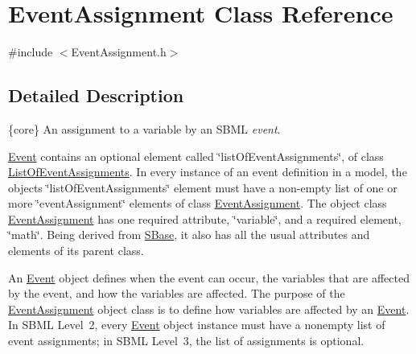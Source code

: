 \hypertarget{class_event_assignment}{}\section{Event\+Assignment Class Reference}
\label{class_event_assignment}


{\ttfamily \#include $<$Event\+Assignment.\+h$>$}



\subsection{Detailed Description}
\{core\} An assignment to a variable by an S\+B\+ML {\itshape event}.

\hyperlink{class_event}{Event} contains an optional element called \char`\"{}list\+Of\+Event\+Assignments\char`\"{}, of class \hyperlink{class_list_of_event_assignments}{List\+Of\+Event\+Assignments}. In every instance of an event definition in a model, the object\textquotesingle{}s \char`\"{}list\+Of\+Event\+Assignments\char`\"{} element must have a non-\/empty list of one or more \char`\"{}event\+Assignment\char`\"{} elements of class \hyperlink{class_event_assignment}{Event\+Assignment}. The object class \hyperlink{class_event_assignment}{Event\+Assignment} has one required attribute, \char`\"{}variable\char`\"{}, and a required element, \char`\"{}math\char`\"{}. Being derived from \hyperlink{class_s_base}{S\+Base}, it also has all the usual attributes and elements of its parent class.

An \hyperlink{class_event}{Event} object defines when the event can occur, the variables that are affected by the event, and how the variables are affected. The purpose of the \hyperlink{class_event_assignment}{Event\+Assignment} object class is to define how variables are affected by an \hyperlink{class_event}{Event}. In S\+B\+ML Level~2, every \hyperlink{class_event}{Event} object instance must have a nonempty list of event assignments; in S\+B\+ML Level~3, the list of assignments is optional.

